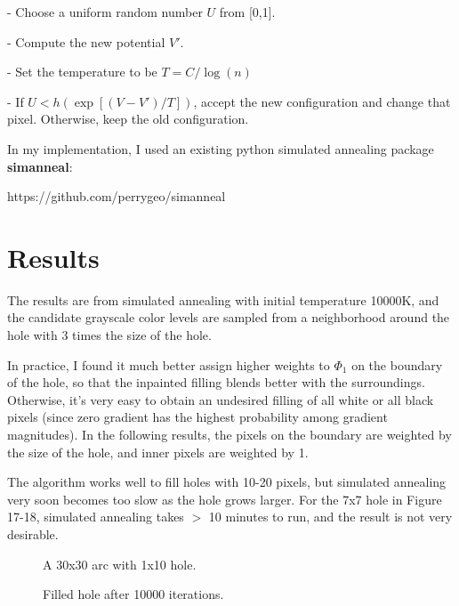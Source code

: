 \documentclass[11pt,letterpaper]{article}
\begin{document}
- Choose a uniform random number $U$ from [0,1].

- Compute the new potential $V'$.

- Set the temperature to be $T = C / \log(n)$

- If $U < h(\exp[(V-V')/T])$, accept the new configuration and change that pixel. Otherwise, keep the old configuration.

\bigskip

In my implementation, I used an existing python simulated annealing package \textbf{simanneal}: 

https://github.com/perrygeo/simanneal

\section{Results}

The results are from simulated annealing with initial temperature 10000K, and the candidate grayscale color levels are sampled from a neighborhood around the hole with 3 times the size of the hole. 

In practice, I found it much better assign higher weights to $\Phi_1$ on the boundary of the hole, so that the inpainted filling blends better with the surroundings. Otherwise, it's very easy to obtain an undesired filling of all white or all black pixels (since zero gradient has the highest probability among gradient magnitudes). In the following results, the pixels on the boundary are weighted by the size of the hole, and inner pixels are weighted by 1.

The algorithm works well to fill holes with 10-20 pixels, but simulated annealing very soon becomes too slow as the hole grows larger. For the 7x7 hole in Figure 17-18, simulated annealing takes $>$ 10 minutes to run, and the result is not very desirable.

\begin{figure}[H]
  \centering
  \begin{minipage}[b]{0.45\textwidth}
  \begin{center}
    \caption{A 30x30 arc with 1x10 hole.}
  \end{center}
  \end{minipage}
  \hfill
   \begin{minipage}[b]{0.45\textwidth}
   \begin{center}
    \caption{Filled hole after 10000 iterations.}
    \end{center}
  \end{minipage}
\end{figure}
\end{document}
